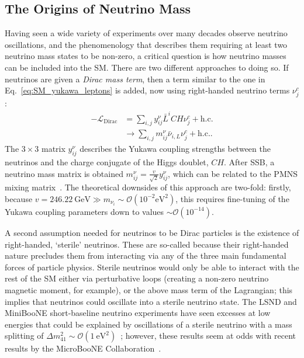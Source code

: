 \subsection{The Origins of Neutrino Mass}
Having seen a wide variety of experiments over many decades observe neutrino oscillations, and the phenomenology that describes them requiring at least two neutrino mass states to be non-zero, a critical question is how neutrino masses can be included into the SM. There are two different approaches to doing so. If neutrinos are given a \textit{Dirac mass term}, then a term similar to the one in Eq.~\ref{eq:SM_yukawa_leptons} is added, now using right-handed neutrino terms $\nu^{c}_{j}$:
\begin{align}
    -\mathcal{L}_{\mathrm{Dirac}} &= \sum_{i,j}y^{\nu}_{ij}\bar{L}^{i}CH\nu^{c}_{j} + \mathrm{ h.c.}\\
                              &\to \sum_{i,j}m^{\nu}_{ij}\bar{\nu}_{i,L}\nu^{c}_{j} + \mathrm{ h.c.}.
\end{align}
The $3\times3$ matrix $y^{\nu}_{ij}$ describes the Yukawa coupling strengths between the neutrinos and the charge conjugate of the Higgs doublet, $CH$. After SSB, a neutrino mass matrix is obtained $m^{\nu}_{ij} = \frac{v}{\sqrt{2}}y^{\nu}_{ij}$, which can be related to the PMNS mixing matrix~\cite{deppischChapterNeutrinosStandard2019}. %
The theoretical downsides of this approach are two-fold: firstly, because $v = \SI{246.22}{\GeV} \gg m_{\nu_{i}}\sim \mathcal{O}(10^{-2}\si{\eV\squared})$, this requires fine-tuning of the Yukawa coupling parameters down to values $\sim\mathcal{O}(10^{-14})$.

A second assumption needed for neutrinos to be Dirac particles is the existence of right-handed, `sterile' neutrinos. These are so-called because their right-handed nature precludes them from interacting via any of the three main fundamental forces of particle physics. Sterile neutrinos would only be able to interact with the rest of the SM either via perturbative loops (creating a non-zero neutrino magnetic moment, for example), or the above mass term of the Lagrangian; this implies that neutrinos could oscillate into a sterile neutrino state. The LSND and MiniBooNE short-baseline neutrino experiments have seen excesses at low energies that could be explained by oscillations of a sterile neutrino with a mass splitting of $\Delta m^{2}_{41}\sim\mathcal{O}(\SI{1}{\eV\squared})$~\cite{aguilarEvidenceNeutrinoOscillations2001,aguilar-arevaloUpdatedMiniBooNENeutrino2021}; %
however, these results seem at odds with recent results by the MicroBooNE Collaboration~\cite{abratenkoFirstConstraintsLight2023}. %

